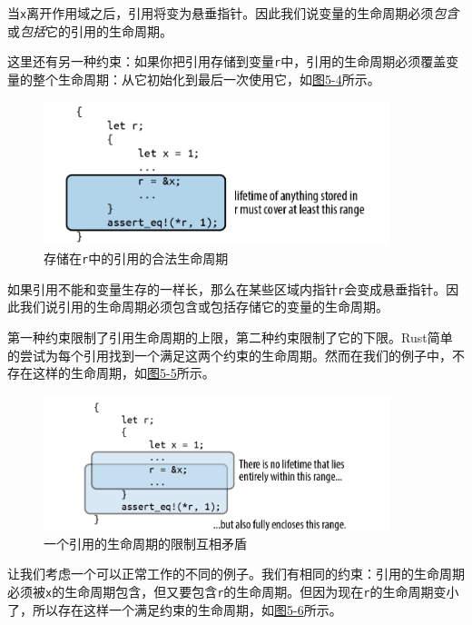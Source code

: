 当\texttt{x}离开作用域之后，引用将变为悬垂指针。因此我们说变量的生命周期必须\emph{包含}或\emph{包括}它的引用的生命周期。

这里还有另一种约束：如果你把引用存储到变量\texttt{r}中，引用的生命周期必须覆盖变量的整个生命周期：从它初始化到最后一次使用它，如\hyperref[f5-4]{图5-4}所示。

\begin{figure}[htbp]
    \centering
    \includegraphics[width=0.9\textwidth]{../img/f5-4.png}
    \caption{存储在\texttt{r}中的引用的合法生命周期}
    \label{f5-4}
\end{figure}

如果引用不能和变量生存的一样长，那么在某些区域内指针\texttt{r}会变成悬垂指针。因此我们说引用的生命周期必须包含或包括存储它的变量的生命周期。

第一种约束限制了引用生命周期的上限，第二种约束限制了它的下限。Rust简单的尝试为每个引用找到一个满足这两个约束的生命周期。然而在我们的例子中，不存在这样的生命周期，如\hyperref[f5-5]{图5-5}所示。

\begin{figure}[htbp]
    \centering
    \includegraphics[width=0.9\textwidth]{../img/f5-5.png}
    \caption{一个引用的生命周期的限制互相矛盾}
    \label{f5-5}
\end{figure}

让我们考虑一个可以正常工作的不同的例子。我们有相同的约束：引用的生命周期必须被\texttt{x}的生命周期包含，但又要包含\texttt{r}的生命周期。但因为现在\texttt{r}的生命周期变小了，所以存在这样一个满足约束的生命周期，如\hyperref[f5-6]{图5-6}所示。

